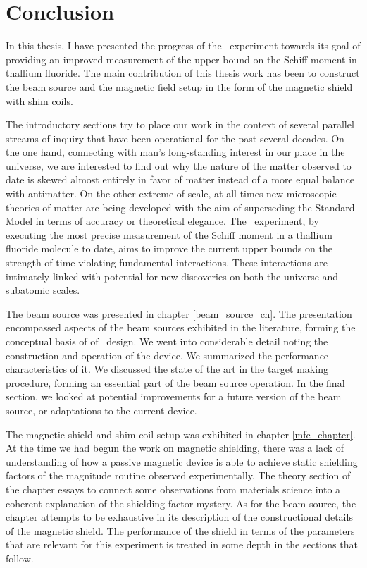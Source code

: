 \section{Conclusion}

In this thesis, I have presented the progress of the \CENTREX\ experiment
towards its goal of providing an improved measurement of the upper bound on the
Schiff moment in thallium fluoride. The main contribution of this thesis work
has been to construct the beam source and the magnetic field setup in the form
of the magnetic shield with shim coils.

The introductory sections try to place our work in the context of several
parallel streams of inquiry that have been operational for the past several
decades. On the one hand, connecting with man's long-standing interest in our
place in the universe, we are interested to find out why the nature of the
matter observed to date is skewed almost entirely in favor of matter instead of
a more equal balance with antimatter. On the other extreme of scale, at all
times new microscopic theories of matter are being developed with the aim of
superseding the Standard Model in terms of accuracy or theoretical elegance.
The \CENTREX\ experiment, by executing the most precise measurement of the
Schiff moment in a thallium fluoride molecule to date, aims to improve the
current upper bounds on the strength of time-violating fundamental interactions.
These interactions are intimately linked with potential for new discoveries on
both the universe and subatomic scales.

The beam source was presented in chapter \ref{beam_source_ch}. The presentation
encompassed aspects of the beam sources exhibited in the literature, forming the
conceptual basis of of \CENTREX\ design. We went into considerable detail noting
the construction and operation of the device. We summarized the performance
characteristics of it. We discussed the state of the art in the target making
procedure, forming an essential part of the beam source operation. In the final
section, we looked at potential improvements for a future version of the beam
source, or adaptations to the current device.

The magnetic shield and shim coil setup was exhibited in chapter
\ref{mfc_chapter}. At the time we had begun the work on magnetic shielding,
there was a lack of understanding of how a passive magnetic device is able to
achieve static shielding factors of the magnitude routine observed
experimentally. The theory section of the chapter essays to connect some
observations from materials science into a coherent explanation of the shielding
factor mystery. As for the beam source, the chapter attempts to be exhaustive in
its description of the constructional details of the magnetic shield. The
performance of the shield in terms of the parameters that are relevant for this
experiment is treated in some depth in the sections that follow.

